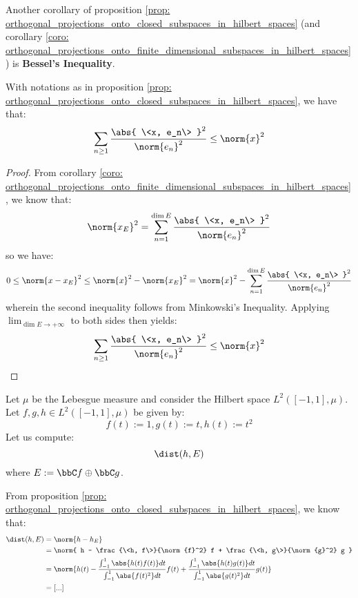         Another corollary of proposition \ref{prop: orthogonal_projections_onto_closed_subspaces_in_hilbert_spaces} (and corollary \ref{coro: orthogonal_projections_onto_finite_dimensional_subspaces_in_hilbert_spaces}) is \textbf{Bessel's Inequality}.
        \begin{corollary} \label{coro: bessel_inequality}
            With notations as in proposition \ref{prop: orthogonal_projections_onto_closed_subspaces_in_hilbert_spaces}, we have that:
                $$\sum_{n \geq 1} \frac{ \abs{ \<x, e_n\> }^2 }{\norm{e_n}^2} \leq \norm{x}^2$$
        \end{corollary}
            \begin{proof}
                From corollary \ref{coro: orthogonal_projections_onto_finite_dimensional_subspaces_in_hilbert_spaces}, we know that:
                    $$\norm{x_E}^2 = \sum_{n = 1}^{\dim E} \frac{ \abs{ \<x, e_n\> }^2 }{\norm{e_n}^2}$$
                so we have:
                    $$0 \leq \norm{x - x_E}^2 \leq \norm{x}^2 - \norm{x_E}^2 = \norm{x}^2 - \sum_{n = 1}^{\dim E} \frac{ \abs{ \<x, e_n\> }^2 }{\norm{e_n}^2}$$
                wherein the second inequality follows from Minkowski's Inequality. Applying $\lim_{\dim E \to +\infty}$ to both sides then yields:
                    $$\sum_{n \geq 1} \frac{ \abs{ \<x, e_n\> }^2 }{\norm{e_n}^2} \leq \norm{x}^2$$
            \end{proof}
        \begin{example}
            Let $\mu$ be the Lebesgue measure and consider the Hilbert space $L^2([-1, 1], \mu)$. Let $f, g, h \in L^2([-1, 1], \mu)$ be given by:
                $$f(t) := 1, g(t) := t, h(t) := t^2$$
            Let us compute:
                $$\dist( h, E )$$
            where $E := \bbC f \oplus \bbC g$.

            From proposition \ref{prop: orthogonal_projections_onto_closed_subspaces_in_hilbert_spaces}, we know that:
                $$
                    \begin{aligned}
                        \dist(h, E) & = \norm{h - h_E}
                        \\
                        & = \norm{ h - \frac{\<h, f\>}{\norm{f}^2} f + \frac{\<h, g\>}{\norm{g}^2} g }
                        \\
                        & = \norm{ h(t) - \frac{\int_{-1}^1 \abs{h(t) f(t)} dt}{\int_{-1}^1 \abs{f(t)^2} dt} f(t) + \frac{\int_{-1}^1 \abs{h(t) g(t)} dt}{\int_{-1}^1 \abs{g(t)^2} dt} g(t) }
                        \\
                        & = [...]
                    \end{aligned}
                $$
        \end{example}

